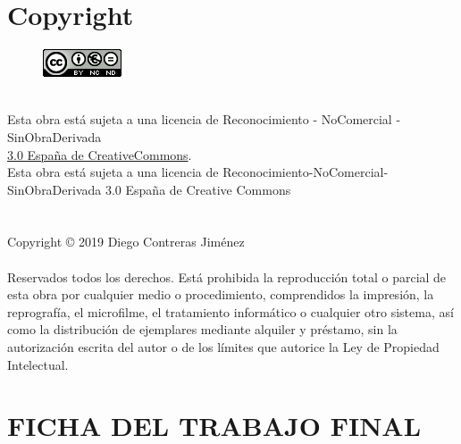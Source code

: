 \setcounter{page}{1} 
\pagestyle{plain}

\chapter*{Copyright}

\vspace{1cm}

\begin{figure}[ht]
    \centering
	\includegraphics[scale=1]{images/license.png}
\end{figure}
\\
Esta obra está sujeta a una licencia de Reconocimiento -  NoComercial - SinObraDerivada
\\
\href{https://creativecommons.org/licenses/by-nc-nd/3.0/es/}{3.0 España de CreativeCommons}.
\\
Esta obra está sujeta a una licencia de Reconocimiento-NoComercial- SinObraDerivada 3.0 España de Creative Commons
\\
\\
\\
Copyright © 2019 Diego Contreras Jiménez
\\
\\
Reservados todos los derechos. Está prohibida la reproducción total o parcial de esta obra por cualquier medio o procedimiento, comprendidos la impresión, la reprografía, el microfilme, el tratamiento informático o cualquier otro sistema, así como la distribución de ejemplares mediante alquiler y préstamo, sin la autorización escrita del autor o de los límites que autorice la Ley de Propiedad Intelectual.

\chapter*{FICHA DEL TRABAJO FINAL}

